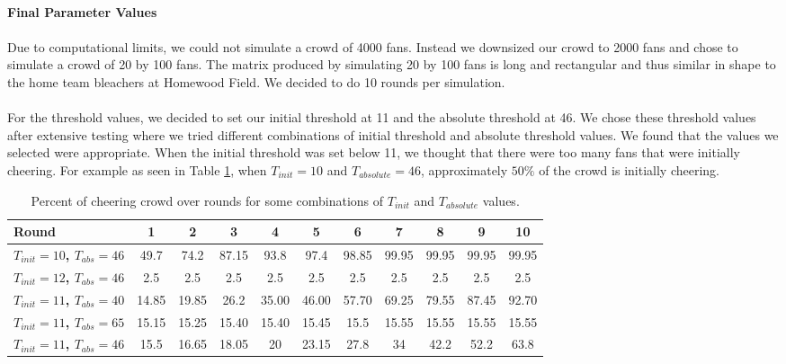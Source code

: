 \documentclass[oneside,12pt]{report}
\begin{document}
\paragraph{Final Parameter Values}
\paragraph{}
Due to computational limits, we could not simulate a crowd of 4000 fans. Instead we downsized our crowd to 2000 fans and chose to simulate a crowd of 20 by 100 fans. The matrix produced by simulating 20 by 100 fans is long and rectangular and thus similar in shape to the home team bleachers at Homewood Field. We decided to do 10 rounds per simulation. 
\paragraph{}
For the threshold values, we decided to set our initial threshold at 11 and the absolute threshold at 46. We chose these threshold values after extensive testing where we tried different combinations of initial threshold and absolute threshold values. We found that the values we selected were appropriate. When the initial threshold was set below 11, we thought that there were too many fans that were initially cheering. For example as seen in Table \ref{valuetest}, when $T_{init}=10$ and $T_{absolute}=46$, approximately $50\%$ of the crowd is initially cheering.

\begin{table}[h!]
\begin{center}
\begin{footnotesize}
\begin{tabular}{|l|c|c|c|c|c|c|c|c|c|c|}
\hline
\textbf{Round}&1&2&3&4&5&6&7&8&9&10\\\hline
\textbf{$T_{init}=10$, $T_{abs}=46$}&49.7&74.2&87.15&93.8&97.4&98.85&99.95&99.95&99.95&99.95\\\hline
\textbf{$T_{init}=12$, $T_{abs}=46$}&2.5&2.5&2.5&2.5&2.5&2.5&2.5&2.5&2.5&2.5\\\hline 
\textbf{$T_{init}=11$, $T_{abs}=40$}&14.85&19.85&26.2&35.00&46.00&57.70&69.25&79.55&87.45&92.70\\\hline
\textbf{$T_{init}=11$, $T_{abs}=65$}&15.15&15.25&15.40&15.40&15.45&15.5&15.55&15.55&15.55&15.55\\\hline
\textbf{$T_{init}=11$, $T_{abs}=46$}&15.5&16.65&18.05&20&23.15&27.8&34&42.2&52.2&63.8\\\hline
\end{tabular}
\end{footnotesize}
\end{center}
\caption{Percent of cheering crowd over rounds for some combinations of $T_{init}$ and $T_{absolute}$ values.}
\label{valuetest}
\end{table}
\end{document}
